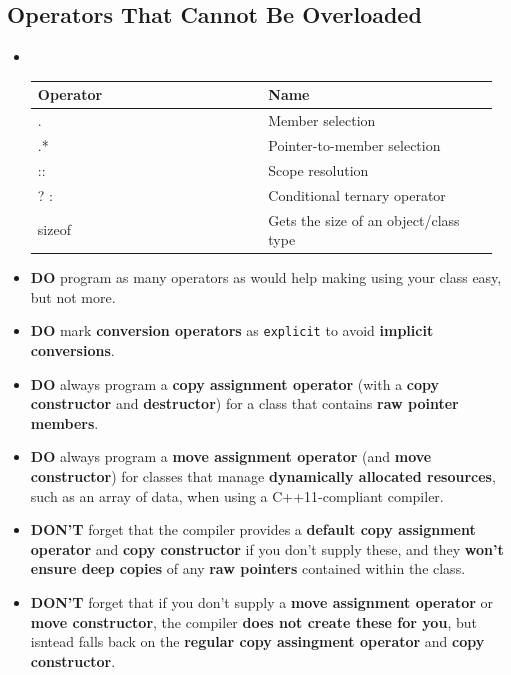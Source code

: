 \documentclass[10pt]{article}
\newcommand{\pbreak}{\vspace{30pt}}
\begin{document}
\subsection{Operators That Cannot Be Overloaded}
\begin{itemize}
	\item {}\\

	\begin{tabular}{p{0.48\linewidth} p{0.48\linewidth}}
		\hline
		Operator & Name\\
		\hline
		.	& Member selection\\
		.*	& Pointer-to-member selection\\
		::	& Scope resolution\\
		? :	& Conditional ternary operator\\
		sizeof	& Gets the size of an object/class type	\\
		\hline
	\end{tabular}

	\pbreak

\item \textbf{DO} program as many operators as would help making using your class easy, but not more.
\item \textbf{DO} mark \textbf{conversion operators} as \verb|explicit| to avoid \textbf{implicit conversions}.
\item \textbf{DO} always program a \textbf{copy assignment operator} (with a \textbf{copy constructor} and \textbf{destructor}) for a class that contains \textbf{raw pointer members}.
\item \textbf{DO} always program a \textbf{move assignment operator} (and \textbf{move constructor}) for classes that manage \textbf{dynamically allocated resources}, such as an array of data, when using a C++11-compliant compiler.

	\pbreak

\item \textbf{DON'T} forget that the compiler provides a \textbf{default copy assignment operator} and \textbf{copy constructor} if you don't supply these, and they \textbf{won't ensure deep copies} of any \textbf{raw pointers} contained within the class.
\item \textbf{DON'T} forget that if you don't supply a \textbf{move assignment operator} or \textbf{move constructor}, the compiler \textbf{does not create these for you}, but isntead falls back on the \textbf{regular copy assingment operator} and \textbf{copy constructor}.
	
\end{itemize}
\end{document}
